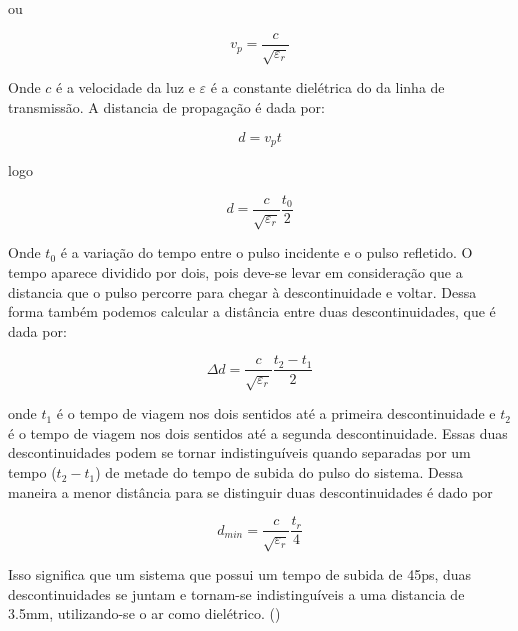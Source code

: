 ou

\begin{equation}
v_p = \frac{c}{\sqrt{\varepsilon_r}}
\end{equation}

Onde $c$ é a velocidade da luz e $\varepsilon$ é a constante dielétrica do da linha de transmissão. A distancia de propagação é dada por:

\begin{equation}
d = v_pt
\end{equation}

logo 

\begin{equation}
\label{eq:distancia}
d = \frac{c}{\sqrt{\varepsilon_r}}\frac{t_0}{2}
\end{equation}

Onde $t_0$ é a variação do tempo entre o pulso incidente e o pulso refletido. O tempo aparece dividido por dois, pois deve-se levar em consideração que a distancia que o pulso percorre para chegar à descontinuidade e voltar. Dessa forma também podemos calcular a distância entre duas descontinuidades, que é dada por:

\begin{equation}
\Delta d = \frac{c}{\sqrt{\varepsilon_r}}\frac{t_2 - t_1}{2}
\end{equation}

onde $t_1$ é o tempo de viagem nos dois sentidos até a primeira descontinuidade e $t_2$ é o tempo de viagem nos dois sentidos até a segunda descontinuidade. Essas duas descontinuidades podem se tornar indistinguíveis quando separadas por um tempo ($t_2 - t_1$) de metade do tempo de subida do pulso do sistema. Dessa maneira a menor distância para se distinguir duas descontinuidades é dado por 

\begin{equation}
d_{min} = \frac{c}{\sqrt{\varepsilon_r}}\frac{t_r}{4}
\end{equation}

Isso significa que um sistema que possui um tempo de subida de 45ps, duas descontinuidades se juntam e tornam-se indistinguíveis a uma distancia de 3.5mm, utilizando-se o ar como dielétrico. (\cite{agilent})






